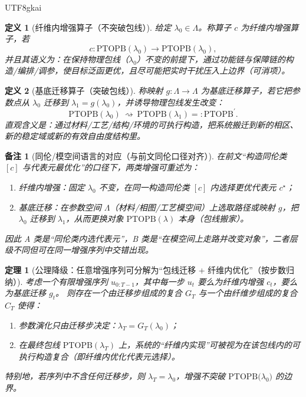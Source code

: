 \documentclass[12pt]{article}
\newtheorem{definition}{定义}[section]
\newtheorem{theorem}{定理}[section]
\newtheorem{remark}{备注}[section]
\newcommand{\PTOPB}{\ensuremath{\mathrm{PTOPB}}}
\begin{document}
\begin{CJK*}{UTF8}{gkai}
\begin{definition}[纤维内增强算子（不突破包线）]
给定 $\lambda_0\in\Lambda$。称算子 $c$ 为纤维内增强算子，若
\[
  c:\PTOPB(\lambda_0)\to \PTOPB(\lambda_0),
\]
并且其语义为：在保持物理包线（$\lambda_0$）不变的前提下，通过功能链与保障链的构造/编排/调参，使目标泛函更优，且尽可能把实时干扰压入上边界（可消项）。
\end{definition}

\begin{definition}[基底迁移算子（突破包线）]
称映射 $g:\Lambda\to\Lambda$ 为基底迁移算子，若它把参数点从 $\lambda_0$ 迁移到 $\lambda_1=g(\lambda_0)$，并诱导物理包线发生改变：
\[
  \PTOPB(\lambda_0)\ \rightsquigarrow\ \PTOPB(\lambda_1)=:\PTOPB^{\prime}.
\]
直观含义是：通过材料/工艺/结构/环境的可执行构造，把系统搬迁到新的相区、新的稳定域或新的有效自由度结构里。
\end{definition}

\begin{remark}[同伦/模空间语言的对应（与前文同伦口径对齐）]
在前文“构造同伦类 $[c]$ 与代表元最优化”的口径下，两类增强可重述为：
\begin{enumerate}
  \item 纤维内增强：固定 $\lambda_0$ 不变，在同一构造同伦类 $[c]$ 内选择更优代表元 $c^\star$；
  \item 基底迁移：在参数空间 $\Lambda$（材料/相图/工艺模空间）上选取路径或映射 $g$，把 $\lambda_0$ 迁移到 $\lambda_1$，从而更换对象 $\PTOPB(\lambda)$ 本身（包线搬家）。
\end{enumerate}
因此 A 类是“同伦类内选代表元”，B 类是“在模空间上走路并改变对象”，二者层级不同但可在同一增强序列中交错出现。
\end{remark}

\begin{theorem}[公理降级：任意增强序列可分解为“包线迁移 + 纤维内优化”（按步数归纳）]
\label{thm:two-level-augmentation-decomposition}
考虑一个有限增强序列 $u_{0:T-1}$，其中每一步 $u_t$ 要么为纤维内增强 $c_t$，要么为基底迁移 $g_t$。
则存在一个由迁移步组成的复合 $G_T$ 与一个由纤维步组成的复合 $C_T$ 使得：
\begin{enumerate}
  \item 参数演化只由迁移步决定：$\lambda_T = G_T(\lambda_0)$；
  \item 在最终包线 $\PTOPB(\lambda_T)$ 上，系统的“纤维内实现”可被视为在该包线内的可执行构造复合（即纤维内优化代表元选择）。
\end{enumerate}
特别地，若序列中不含任何迁移步，则 $\lambda_T=\lambda_0$，增强不突破 $\PTOPB\bigl(\lambda_0\bigr)$ 的边界。
\end{theorem}


\end{CJK*}
\end{document}

